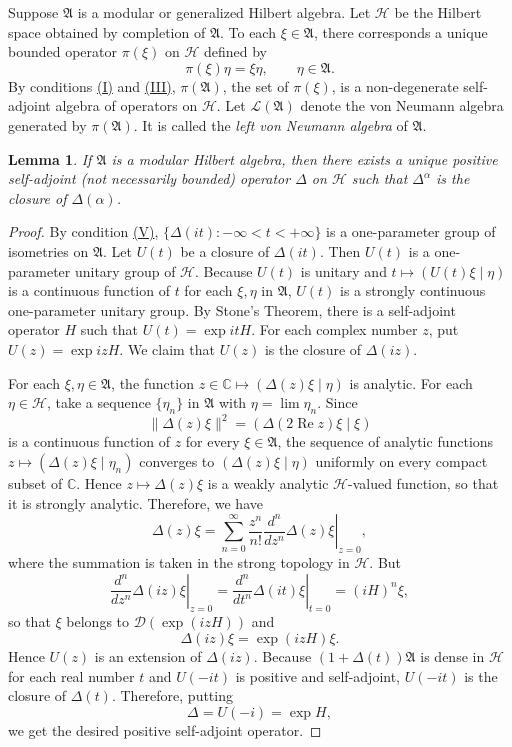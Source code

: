 \documentclass[12pt,b5paper,twoside]{article}
\theoremstyle{takesaki}
\newtheorem{lemma}{Lemma}[section]
\numberwithin{equation}{section}
\newcommand{\modcondref}[1]{\hyperref[cond:2.1:#1]{(#1)}}
\begin{document}
Suppose $\mathfrak A$ is a modular or generalized Hilbert algebra.  Let
$\mathcal H$ be the Hilbert space obtained by completion of
$\mathfrak A$.  To each $\xi\in\mathfrak A$, there corresponds a unique
bounded operator $\pi(\xi)$ on $\mathcal H$ defined by
\[
  \pi(\xi)\eta=\xi\eta,\qquad \eta\in\mathfrak A.
\]
By conditions \modcondref{I} and \modcondref{III}, $\pi(\mathfrak A)$, the set of $\pi(\xi)$,
is a non-degenerate self-adjoint algebra of operators on $\mathcal H$.
Let $\mathcal L(\mathfrak A)$ denote the von Neumann algebra generated by
$\pi(\mathfrak A)$.  It is called the \emph{left von Neumann algebra} of
$\mathfrak A$.

\begin{lemma}\label{lem:2.1}
If $\mathfrak A$ is a modular Hilbert algebra, then there exists a unique
positive self-adjoint (not necessarily bounded) operator $\Delta$ on
$\mathcal H$ such that $\Delta^\alpha$ is the closure of
$\Delta(\alpha)$.
\end{lemma}

\begin{proof}
By condition \modcondref{V}, $\{\Delta(it):-\infty<t<+\infty\}$ is a one-parameter
group of isometries on $\mathfrak A$.  Let $U(t)$ be a closure of
$\Delta(it)$.  Then $U(t)$ is a one-parameter unitary group of
$\mathcal H$.  Because $U(t)$ is unitary and
$t\mapsto(U(t)\xi\mid\eta)$ is a continuous function of $t$ for each
$\xi,\eta$ in $\mathfrak A$, $U(t)$ is a strongly continuous
one-parameter unitary group.  By Stone's Theorem, there is a
self-adjoint operator $H$ such that $U(t)=\exp itH$.  For each complex
number $z$, put $U(z)=\exp izH$.  We claim that $U(z)$ is the closure of
$\Delta(iz)$.

For each $\xi,\eta\in\mathfrak A$, the function
$z\in\mathbb C\mapsto(\Delta(z)\xi\mid\eta)$ is analytic.  For each
$\eta\in\mathcal H$, take a sequence $\{\eta_n\}$ in $\mathfrak A$ with
$\eta=\lim\eta_n$.  Since
\[
  \|\Delta(z)\xi\|^2
    =(\Delta(2\operatorname{Re}z)\xi\mid\xi)
\]
is a continuous function of $z$ for every $\xi\in\mathfrak A$, the
sequence of analytic functions
$z\mapsto(\Delta(z)\xi\mid\eta_n)$ converges to
$(\Delta(z)\xi\mid\eta)$ uniformly on every compact subset of
$\mathbb C$.  Hence $z\mapsto\Delta(z)\xi$ is a weakly analytic
$\mathcal H$-valued function, so that it is strongly analytic.
Therefore, we have
\[
  \Delta(z)\xi
    =\sum_{n=0}^{\infty}\frac{z^n}{n!}
      \left.\frac{d^n}{dz^n}\Delta(z)\xi\right|_{z=0},
\]
where the summation is taken in the strong topology in $\mathcal H$.
But
\[
  \left.\frac{d^n}{dz^n}\Delta(iz)\xi\right|_{z=0}
   =\left.\frac{d^n}{dt^n}\Delta(it)\xi\right|_{t=0}
   =(iH)^n\xi,
\]
so that $\xi$ belongs to $\mathcal D(\exp(izH))$ and
\[
  \Delta(iz)\xi=\exp(izH)\xi.
\]
Hence $U(z)$ is an extension of $\Delta(iz)$.  Because
$(1+\Delta(t))\mathfrak A$ is dense in $\mathcal H$ for each real number
$t$ and $U(-it)$ is positive and self-adjoint, $U(-it)$ is the closure
of $\Delta(t)$.  Therefore, putting
\[
  \Delta=U(-i)=\exp H,
\]
we get the desired positive self-adjoint operator.
\end{proof}
\end{document}
